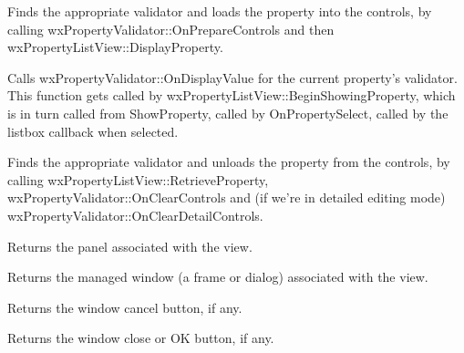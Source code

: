 Finds the appropriate validator and loads the property into the controls, by calling
wxPropertyValidator::OnPrepareControls and then wxPropertyListView::DisplayProperty.

\label{wxpropertylistviewdisplayproperty}


Calls wxPropertyValidator::OnDisplayValue for the current property's validator. This function
gets called by wxPropertyListView::BeginShowingProperty, which is in turn called
from ShowProperty, called by OnPropertySelect, called by the listbox callback when selected.

\label{wxpropertylistviewendshowingproperty}


Finds the appropriate validator and unloads the property from the controls, by calling
wxPropertyListView::RetrieveProperty, wxPropertyValidator::OnClearControls and (if we're in
detailed editing mode) wxPropertyValidator::OnClearDetailControls.

\label{wxpropertylistviewgetpanel}


Returns the panel associated with the view.

\label{wxpropertylistviewgetmanagedwindow}


Returns the managed window (a frame or dialog) associated with the view.

\label{wxpropertylistviewgetwindowcancelbutton}


Returns the window cancel button, if any.

\label{wxpropertylistviewgetwindowclosebutton}


Returns the window close or OK button, if any.

\label{wxpropertylistviewgetwindowhelpbutton}

